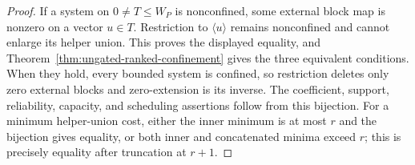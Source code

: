 \begin{proof}
If a system on $0\ne T\leq W_P$ is nonconfined, some external block map is
nonzero on a vector $u\in T$.  Restriction to $\langle u\rangle$ remains
nonconfined and cannot enlarge its helper union.  This proves the displayed
equality, and Theorem~\ref{thm:ungated-ranked-confinement} gives the three
equivalent conditions.  When they hold, every bounded system is confined, so
restriction deletes only zero external blocks and zero-extension is its
inverse.  The coefficient, support, reliability, capacity, and scheduling
assertions follow from this bijection.  For a minimum helper-union cost, either
the inner minimum is at most $r$ and the bijection gives equality, or both
inner and concatenated minima exceed $r$; this is precisely equality after
truncation at $r+1$.
%
%
\end{proof}
